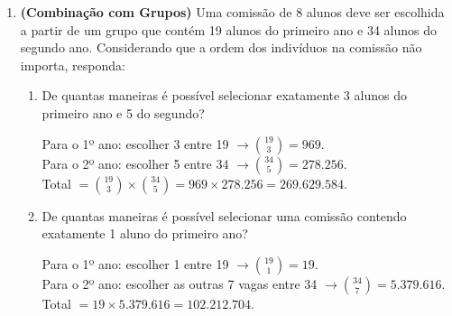 \documentclass[12pt]{article}
\begin{document}
\begin{enumerate}
\vspace{0.2cm}
\begin{tcolorbox}[colback=white, colframe=maincolor, arc=2mm, boxrule=1pt, title=\textit{Resolução:}, coltitle=white, title filled=true]
A ordem dos sorteados não importa (é apenas um grupo). Portanto, usamos Combinação Simples:
\[
\binom{10}{3} = \frac{10!}{3! (10-3)!} = \frac{10 \times 9 \times 8}{3 \times 2 \times 1} = \frac{720}{6} = \mathbf{120} \text{ formas.}
\]
\end{tcolorbox}


\item \textbf{(Combinação com Grupos)} Uma comissão de 8 alunos deve ser escolhida a partir de um grupo que contém 19 alunos do primeiro ano e 34 alunos do segundo ano. Considerando que a ordem dos indivíduos na comissão não importa, responda:
\begin{enumerate}[label=\alph*)]
    \item De quantas maneiras é possível selecionar exatamente 3 alunos do primeiro ano e 5 do segundo?
\vspace{0.2cm}
\begin{tcolorbox}[colback=white, colframe=maincolor, arc=2mm, boxrule=1pt, title=\textit{Resolução:}, coltitle=white, title filled=true]
Para o 1º ano: escolher 3 entre 19 $\rightarrow \binom{19}{3} = 969$. \\
Para o 2º ano: escolher 5 entre 34 $\rightarrow \binom{34}{5} = 278.256$. \\
Total $= \binom{19}{3} \times \binom{34}{5} = 969 \times 278.256 = \mathbf{269.629.584}$.
\end{tcolorbox}

    \item De quantas maneiras é possível selecionar uma comissão contendo exatamente 1 aluno do primeiro ano?
\vspace{0.2cm}
\begin{tcolorbox}[colback=white, colframe=maincolor, arc=2mm, boxrule=1pt, title=\textit{Resolução:}, coltitle=white, title filled=true]
Para o 1º ano: escolher 1 entre 19 $\rightarrow \binom{19}{1} = 19$. \\
Para o 2º ano: escolher as outras 7 vagas entre 34 $\rightarrow \binom{34}{7} = 5.379.616$. \\
Total $= 19 \times 5.379.616 = \mathbf{102.212.704}$.
\end{tcolorbox}


\end{enumerate}
\end{enumerate}
\end{document}
